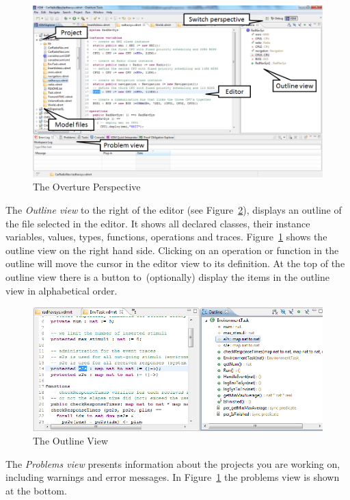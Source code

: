 \begin{figure}[!htb]
\begin{center}
  \includegraphics[width=4.5in]{figures/OverturePerspectiveRT}
  \caption[labelInTOC]{The Overture Perspective}
  \label{fig:userguide:OverturePerspective}
\end{center}
\end{figure}

The \emph{Outline view} to the right of the editor (see
Figure~\ref{fig:userguide:OutlineView}), displays an outline of the
file selected in the editor. It shows all declared classes, their
instance variables, values, types, functions, operations and traces.
Figure~\ref{fig:userguide:OverturePerspective} shows the outline view
on the right hand side. Clicking on an operation or function in the
outline will move the cursor in the editor view to its definition. At
the top of the outline view there is a button to~(optionally) display
the items in the outline view in alphabetical order.

\begin{figure}[!h]
\begin{center}
  \includegraphics[width=4.5in]{figures/OutlineViewRT}
  \caption[labelInTOC]{The Outline View}
  \label{fig:userguide:OutlineView}
\end{center}
\end{figure}

The \emph{Problems view} presents information about the projects you
are working on, including warnings and error messages. In
Figure~\ref{fig:userguide:OverturePerspective} the problems view is
shown at the bottom.

